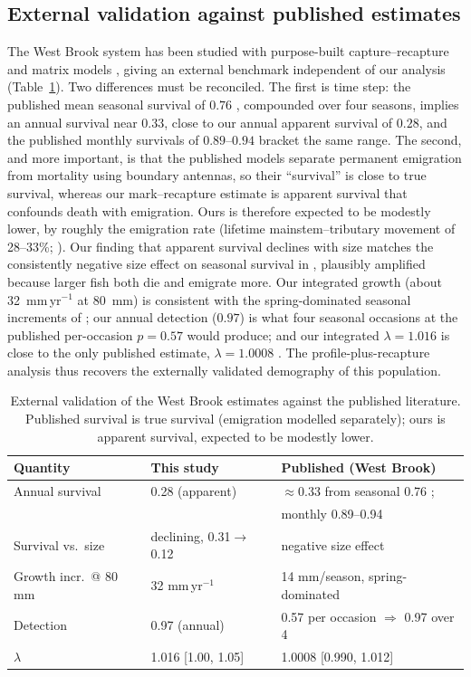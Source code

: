 \documentclass[11pt]{article}
\begin{document}
\subsection{External validation against published estimates}
\label{sec:app-validation}
The West Brook system has been studied with purpose-built capture--recapture and
matrix models \citep{letcher2007,letcher2015,kanno2014}, giving an external
benchmark independent of our analysis (Table~\ref{tab:validation}). Two
differences must be reconciled. The first is time step: the published mean
seasonal survival of $0.76$ \citep{letcher2015}, compounded over four seasons,
implies an annual survival near $0.33$, close to our annual apparent survival of
$0.28$, and the published monthly survivals of $0.89$--$0.94$ \citep{letcher2007}
bracket the same range. The second, and more important, is that the published
models separate permanent emigration from mortality using boundary antennas, so
their ``survival'' is close to true survival, whereas our mark--recapture estimate
is apparent survival that confounds death with emigration. Ours is therefore
expected to be modestly lower, by roughly the emigration rate (lifetime
mainstem--tributary movement of 28--33\%; \citealp{kanno2014}). Our finding that
apparent survival declines with size matches the consistently negative size effect
on seasonal survival in \citet{letcher2015}, plausibly amplified because larger
fish both die and emigrate more. Our integrated growth (about 32~mm\,yr$^{-1}$ at
80~mm) is consistent with the spring-dominated seasonal increments of
\citet{letcher2015}; our annual detection ($0.97$) is what four seasonal occasions
at the published per-occasion $p=0.57$ would produce; and our integrated
$\lambda = 1.016$ is close to the only published estimate, $\lambda = 1.0008$
\citep{letcher2007}. The profile-plus-recapture analysis thus recovers the
externally validated demography of this population.

\begin{table}[H]
\centering
\caption{External validation of the West Brook estimates against the published
literature. Published survival is true survival (emigration modelled
separately); ours is apparent survival, expected to be modestly lower.}
\label{tab:validation}
\small
\begin{tabular}{lll}
\toprule
Quantity & This study & Published (West Brook)\\
\midrule
Annual survival & 0.28 (apparent) & $\approx$0.33 from seasonal 0.76 \citep{letcher2015};\\
 & & monthly 0.89--0.94 \citep{letcher2007}\\
Survival vs.\ size & declining, 0.31$\to$0.12 & negative size effect \citep{letcher2015}\\
Growth incr.\ @ 80 mm & 32 mm\,yr$^{-1}$ & 14 mm/season, spring-dominated \citep{letcher2015}\\
Detection & 0.97 (annual) & 0.57 per occasion $\Rightarrow$ 0.97 over 4 \citep{letcher2015}\\
$\lambda$ & 1.016 [1.00, 1.05] & 1.0008 [0.990, 1.012] \citep{letcher2007}\\
\bottomrule
\end{tabular}
\end{table}
\end{document}
